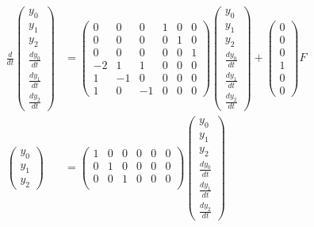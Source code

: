 \documentclass[a4paper,11pt]{jreport}
\begin{document}
\begin{align}
 \frac{d}{dt} \left(\begin{array}{c}
	         y_0 \\
		     y_1 \\
		     y_2 \\
		     \frac{dy_0}{dt} \\
		     \frac{dy_1}{dt} \\
		     \frac{dy_2}{dt}
		    \end{array}\right)
 &=
 \left(\begin{array}{rrrrrr}
        0 & 0 & 0 & 1 & 0 & 0      \\
        0 & 0 & 0 & 0 & 1 & 0      \\
        0 & 0 & 0 & 0 & 0 & 1      \\
	-2& 1 & 1 & 0 & 0 & 0 \\
	1 & -1& 0 & 0 & 0 & 0 \\
	1 & 0 & -1& 0 & 0 & 0 
       \end{array}\right)
 \left(\begin{array}{c}
	         y_0 \\
		     y_1 \\
		     y_2 \\
		     \frac{dy_0}{dt} \\
		     \frac{dy_1}{dt} \\
		     \frac{dy_2}{dt}
       \end{array}\right)
 +
 \left(\begin{array}{c}
        0 \\
        0 \\
        0 \\
	    1 \\
	    0 \\
	    0 
       \end{array}\right)
        F
\nonumber
\\
 \left(\begin{array}{c}
	    y_0 \\
		y_1 \\
		y_2
       \end{array}\right)
 &=
 \left(\begin{array}{rrrrrr}
         1 & 0 & 0 & 0 & 0 & 0  \\
         0 & 1 & 0 & 0 & 0 & 0 \\
         0 & 0 & 1 & 0 & 0 & 0 \\
       \end{array}\right)
 \left(\begin{array}{c}
	         y_0 \\
		     y_1 \\
		     y_2 \\
		     \frac{dy_0}{dt} \\
		     \frac{dy_1}{dt} \\
		     \frac{dy_2}{dt}
       \end{array}\right)
\nonumber
\end{align}
\end{document}
